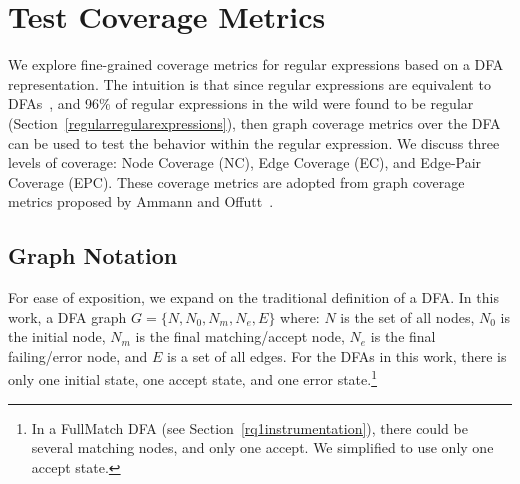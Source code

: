 

\section{Test Coverage Metrics}
\label{sec:coverage}
We explore fine-grained coverage metrics for regular expressions based on a DFA representation. 
The intuition is that since regular expressions are equivalent to DFAs~\cite{sipser2006introduction}, and 96\% of regular expressions in the wild were found to be regular (Section~\ref{regularregularexpressions}), then graph coverage metrics over the DFA can be used to test the behavior within the regular expression.  
We discuss three levels of coverage: Node Coverage (NC), Edge Coverage (EC), and Edge-Pair Coverage (EPC). These coverage metrics are adopted from graph coverage metrics proposed by Ammann and Offutt~\cite[Chapter 7]{ammann2016introduction}. 

\subsection{Graph Notation} 
For ease of exposition, we expand on the traditional definition of a DFA. In this work, a DFA graph $G = \{N, N_0, N_m, N_e, E\}$ where: $N$ is the set of all nodes, $N_0$ is the initial node, $N_m$ is the final matching/accept node, $N_e$ is the final failing/error node, and $E$ is a set of all edges. 
For the DFAs in this work, there is only one initial state, one accept state, and one error state.\footnote{In a FullMatch DFA (see Section~\ref{rq1instrumentation}), there could be several matching nodes, and only one accept. We simplified to use only one accept state.}

